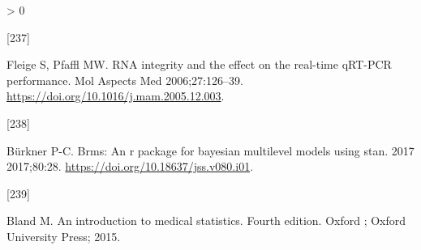 \documentclass[twoside,10pt]{gihclass} %
\newlength{\cslhangindent}
\newlength{\csllabelwidth}
\newenvironment{CSLReferences}[3] %
 {%
  \setlength{\parindent}{0pt}
  \ifodd #1 \everypar{\setlength{\hangindent}{\cslhangindent}}\ignorespaces\fi
  \ifnum #2 > 0
  \setlength{\parskip}{#2\baselineskip}
  \fi
 }%
 {}
\newcommand{\CSLLeftMargin}[1]{\parbox[t]{\maxof{\widthof{#1}}{\csllabelwidth}}{#1}}
\newcommand{\CSLRightInline}[1]{\parbox[t]{\linewidth}{#1}}
\begin{document}
\begin{CSLReferences}{0}{0}
\leavevmode\hypertarget{ref-RN2248}{}%
\CSLLeftMargin{{[}237{]} }
\CSLRightInline{Fleige S, Pfaffl MW. RNA integrity and the effect on the real-time qRT-PCR performance. Mol Aspects Med 2006;27:126--39. \url{https://doi.org/10.1016/j.mam.2005.12.003}.}

\leavevmode\hypertarget{ref-RN2562}{}%
\CSLLeftMargin{{[}238{]} }
\CSLRightInline{Bürkner P-C. Brms: An r package for bayesian multilevel models using stan. 2017 2017;80:28. \url{https://doi.org/10.18637/jss.v080.i01}.}

\leavevmode\hypertarget{ref-RN2007}{}%
\CSLLeftMargin{{[}239{]} }
\CSLRightInline{Bland M. An introduction to medical statistics. Fourth edition. Oxford ; Oxford University Press; 2015.}

\end{CSLReferences}

\end{document}
